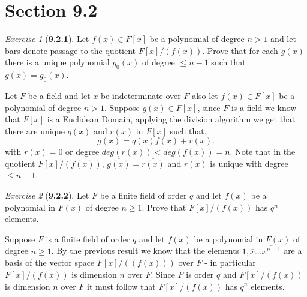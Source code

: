 \documentclass[12pt]{amsart}
\makeatletter
\theoremstyle{remark}
\newtheorem*{exercise}{Exercise}%
\renewenvironment{proof}[1][\proofname]{\par\doublespacing
  \pushQED{\qed}%
  \normalfont \topsep6\p@\@plus6\p@\relax
  \list{}{%
    \settowidth{\leftmargin}{\itshape\proofname:\hskip\labelsep}%
    \setlength{\labelwidth}{0pt}%
    \setlength{\itemindent}{-\leftmargin}%
  }%
  \item[\hskip\labelsep\itshape#1\@addpunct{:}]\ignorespaces
}{%
  \popQED\endlist\@endpefalse
  \singlespacing
}
\theoremstyle{mycomment}
\makeatother
\begin{document}
\thispagestyle{fancy}
\author{Coordinator: Coordinator's Name}


% 
% 




\section*{\textbf{Section 9.2}}

\begin{exercise}[\textbf{9.2.1}] Let $f(x) \in F[x]$ be a polynomial of degree $n > 1$ and let bars denote passage 
  to the quotient $F[x]/(f(x))$. Prove that for each $\overline{g(x)}$ there is a unique polynomial $g_0(x)$ of degree $\leq n - 1$
  such that $\overline{g(x)} = \overline{g_0(x)}$.
  \begin{proof} Let $F$ be a field and let $x$ be indeterminate over $F$ also let $f(x) \in F[x]$ be a 
    polynomial of degree $n > 1$. Suppose $g(x) \in F[x]$, since $F$ is a field we know that $F[x]$ is a Euclidean Domain, 
    applying the division algorithm we get that there are unique $q(x)$ and $r(x)$ in $F[x]$ such that, 
    \begin{equation*}
      g(x) = q(x)f(x) + r(x).  
    \end{equation*}
    with $r(x) = 0$ or degree $deg(r(x)) < deg(f(x)) = n$. Note that in the quotient $F[x]/(f(x))$, $\overline{g(x)} = \overline{r(x)}$
    and $r(x)$ is unique with  degree $\leq n - 1$.
  \end{proof}
\end{exercise}
\vspace{.5in}


\begin{exercise}[\textbf{9.2.2}] Let $F$ be a finite field of order $q$ and let $f(x)$ be a polynomial in $F(x)$ of degree $n \geq 1$.
  Prove that $F[x]/(f(x))$ has $q^n$ elements. 
  \begin{proof} Suppose $F$ is a finite field of order $q$ and let $f(x)$ be a polynomial in $F(x)$ of degree $n \geq 1$. By the previous result 
    we know that the elements $\overline{1}, \overline{x} \dots \overline{x^{n - 1}}$ are a basis of the vector space $F[x]/((f(x)))$ over $F$ - in particular
    $F[x]/(f(x))$ is dimension $n$ over $F$. Since $F$ is order $q$ and $F[x]/(f(x))$ is dimension $n$ over $F$ it must follow that $F[x]/(f(x))$ has $q^n$ elements.
  \end{proof}
\end{exercise}
\vspace{.5in}
\end{document}
